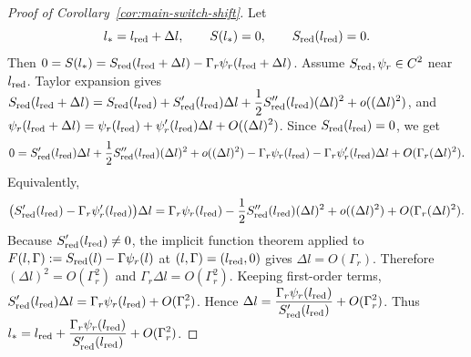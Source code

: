 \documentclass[pdflatex,sn-mathphys-num]{sn-jnl}
\theoremstyle{thmstyleone}
\theoremstyle{definition}
\theoremstyle{remark}
\numberwithin{equation}{section}
\begin{document}
\begin{proof}[Proof of Corollary~\ref{cor:main-switch-shift}]
Let
\[
l_*=l_{\rm red}+\Delta l,
\qquad
S(l_*)=0,
\qquad
S_{\rm red}(l_{\rm red})=0.
\]
Then
$\displaystyle 
0
=
S(l_*)
=
S_{\rm red}(l_{\rm red}+\Delta l)
-
\Gamma_r\psi_r(l_{\rm red}+\Delta l)$.
Assume
$\displaystyle 
S_{\rm red},\psi_r\in C^2$
near $\displaystyle l_{\rm red}$.
Taylor expansion gives
$\displaystyle 
S_{\rm red}(l_{\rm red}+\Delta l)
=
S_{\rm red}(l_{\rm red})
+
S_{\rm red}'(l_{\rm red})\Delta l
+
\frac12S_{\rm red}''(l_{\rm red})(\Delta l)^2
+
o((\Delta l)^2)$,
and
$\displaystyle 
\psi_r(l_{\rm red}+\Delta l)
=
\psi_r(l_{\rm red})
+
\psi_r'(l_{\rm red})\Delta l
+
O((\Delta l)^2)$.
Since
$\displaystyle 
S_{\rm red}(l_{\rm red})=0$,
we get
\[
0
=
S_{\rm red}'(l_{\rm red})\Delta l
+
\frac12S_{\rm red}''(l_{\rm red})(\Delta l)^2
+
o((\Delta l)^2)
-
\Gamma_r\psi_r(l_{\rm red})
-
\Gamma_r\psi_r'(l_{\rm red})\Delta l
+
O(\Gamma_r(\Delta l)^2).
\]
Equivalently,
\[
\big(S_{\rm red}'(l_{\rm red})
-
\Gamma_r\psi_r'(l_{\rm red})\big)\Delta l
=
\Gamma_r\psi_r(l_{\rm red})
-
\frac12S_{\rm red}''(l_{\rm red})(\Delta l)^2
+
o((\Delta l)^2)
+
O(\Gamma_r(\Delta l)^2).
\]
Because
$\displaystyle 
S_{\rm red}'(l_{\rm red})\ne0$,
the implicit function theorem applied to
$\displaystyle 
F(l,\Gamma):=S_{\rm red}(l)-\Gamma\psi_r(l)$
at
$\displaystyle 
(l,\Gamma)=(l_{\rm red},0)$
gives
$\displaystyle 
\Delta l=O(\Gamma_r)$.
Therefore
$\displaystyle 
(\Delta l)^2=O(\Gamma_r^2)$ and
$\displaystyle 
\Gamma_r\Delta l=O(\Gamma_r^2)$.
Keeping first-order terms,
$\displaystyle 
S_{\rm red}'(l_{\rm red})\Delta l
=
\Gamma_r\psi_r(l_{\rm red})
+
O(\Gamma_r^2)$.
Hence
$\displaystyle 
\Delta l
=
\frac{\Gamma_r\psi_r(l_{\rm red})}
     {S_{\rm red}'(l_{\rm red})}
+
O(\Gamma_r^2)$.
Thus
$\displaystyle 
l_*
=
l_{\rm red}
+
\frac{\Gamma_r\psi_r(l_{\rm red})}
     {S_{\rm red}'(l_{\rm red})}
+
O(\Gamma_r^2)$.
\end{proof}
\end{document}

